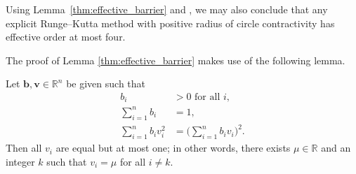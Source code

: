 \begin{remark}
	Using Lemma~\ref{thm:effective_barrier} and \cite[Theorem~4.1]{dahlquist2006}, 
  	we may also conclude that any explicit Runge--Kutta method with positive radius of
  	circle contractivity has effective order at most four.
\end{remark}

The proof of Lemma \ref{thm:effective_barrier} makes use of the following 
lemma.
\begin{lemma}\label{Davids_lemma}
	Let $\bm{b},\bm{v} \in \mathbb{R}^{n}$ be given such that
    \begin{subequations}\label{eq:DavidsLemma}
    		\begin{align}
    			b_i & > 0 \mbox{ for all } i, \label{eq:DavidsLemma_a} \\
    			\sum_{i=1}^n b_i & = 1, \label{eq:DavidsLemma_b} \\
    			\sum_{i=1}^n b_i v_i^2 & = \biggl(\sum_{i=1}^n b_i v_i\biggr)^{\!\! 2}. \label{eq:DavidsLemma_c}
    		\end{align}
    	\end{subequations}
    	Then all $v_i$ are equal but at most one; in other words, there exists 
    	$\mu \in \mathbb{R}$ and an integer $k$ such that $v_i = \mu$ for 
    	all $i \ne k$.
\end{lemma}

